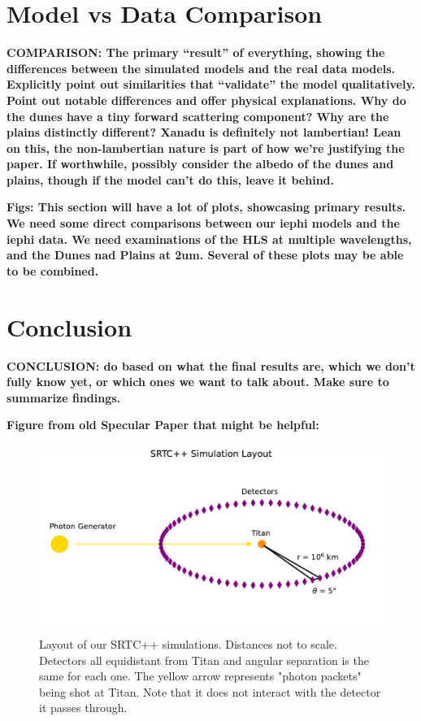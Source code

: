 \documentclass[twocolumn,linenumbers]{aastex631}
\begin{document}
\section{Model vs Data Comparison} \label{sec:compare}

\textbf{\color{blue}COMPARISON: The primary ``result'' of everything, showing the differences between the simulated models and the real data models. Explicitly point out similarities that ``validate'' the model qualitatively. Point out notable differences and offer physical explanations. Why do the dunes have a tiny forward scattering component? Why are the plains distinctly different? Xanadu is definitely not lambertian!  Lean on this, the non-lambertian nature is part of how we're justifying the paper. If worthwhile, possibly consider the albedo of the dunes and plains, though if the model can't do this, leave it behind.\color{black}}

\textbf{\color{blue}Figs: This section will have a lot of plots, showcasing primary results. We need some direct comparisons between our iephi models and the iephi data. We need examinations of the HLS at multiple wavelengths, and the Dunes nad Plains at 2um. Several of these plots may be able to be combined.\color{black}}

\section{Conclusion} \label{sec:conclusion}

\textbf{\color{blue}CONCLUSION: do based on what the final results are, which we don't fully know yet, or which ones we want to talk about. Make sure to summarize findings. \color{black}}

\textbf{\color{red}Figure from old Specular Paper that might be helpful:\color{black}}

\begin{figure}[htbp]
\includegraphics[scale = 0.5]{SRTCLayout.pdf}
\centering
\caption{Layout of our SRTC++ simulations. Distances not to scale. Detectors all equidistant from Titan and angular separation is the same for each one. The yellow arrow represents "photon packets" being shot at Titan. Note that it does not interact with the detector it passes through.}
\label{fig:5}
\end{figure}
\end{document}
